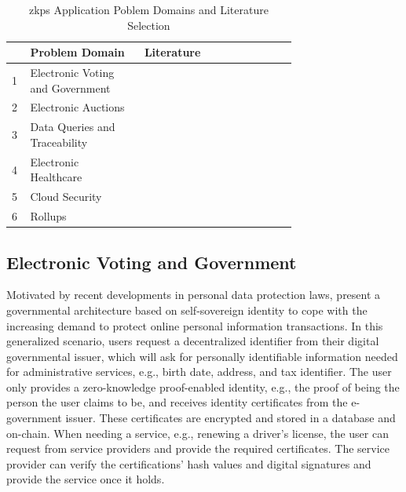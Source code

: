 \setlength{\tabcolsep}{2ex}
\renewcommand{\arraystretch}{1.5}%
\begin{table}[ht]
	\centering
	    \caption{\acrshort{zkp}s Application Poblem Domains and Literature Selection}
		\begin{tabular}{| m{0.02\linewidth} | m{0.3\linewidth} | m{0.4\linewidth}|}
		\hline
		\textbf{} & \textbf{Problem Domain} & \textbf{Literature} \\ \hline
            1 & Electronic Voting and \newline Government & \citet{Bansod, Guo, Querejeta} \\  \hline
            2 & Electronic Auctions & \citet{LiXue, WangZhaoMu} \\ \hline 
            3 & Data Queries and \newline Traceability & \citet{Godden, XueWang}  \\  \hline
            4 & Electronic Healthcare & \citet{LuongPark, ZHENG, WangEtAl, Huangetal} \\  \hline 
            5 & Cloud Security & \citet{LiuWangPengXing, Major, Munivel, Kanagamani} \\  \hline 
            6 & Rollups & \citet{chen2022review, scalingintro, zksyncintro, buterinrollups} \\  \hline 
	\end{tabular}
\label{tab:domains}
\end{table}

\subsection{Electronic Voting and Government}
Motivated by recent developments in personal data protection laws, \citet{Bansod} present a governmental architecture based on self-sovereign identity to cope with the increasing demand to protect online personal information transactions. In this generalized scenario, users request a decentralized identifier from their digital governmental issuer, which will ask for personally identifiable information needed for administrative services, e.g., birth date, address, and tax identifier. The user only provides a zero-knowledge proof-enabled identity, e.g., the proof of being the person the user claims to be, and receives identity certificates from the e-government issuer. These certificates are encrypted and stored in a database and on-chain. When needing a service, e.g., renewing a driver's license, the user can request from service providers and provide the required certificates. The service provider can verify the certifications' hash values and digital signatures and provide the service once it holds.

